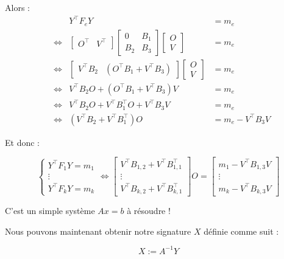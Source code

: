 \documentclass[12pt, a4paper]{article}
\begin{document}
	Alors :
	\begin{align*}
		&&Y^\top F_e Y &= m_e \\
		&\Leftrightarrow &\begin{bmatrix} O^\top & V^\top \end{bmatrix} \begin{bmatrix}
			0 & B_1 \\
			B_2 & B_3
		\end{bmatrix} \begin{bmatrix} O \\ V \end{bmatrix} &= m_e \\
		&\Leftrightarrow &\begin{bmatrix} V^\top B_2 & (O^\top B_1 + V^\top B_3) \end{bmatrix} \begin{bmatrix} O \\ V \end{bmatrix} &= m_e \\
		&\Leftrightarrow &V^\top B_2 O + (O^\top B_1 + V^\top B_3) V &= m_e \\
		&\Leftrightarrow &V^\top B_2 O + V^\top B_1^\top O + V^\top B_3V &= m_e \\
		&\Leftrightarrow &(V^\top B_2 + V^\top B_1^\top) O &= m_e - V^\top B_3 V
	\end{align*}
	
	Et donc :
	
	$$
	\begin{cases}
		Y^\top F_1 Y = m_1 \\
		\vdots \\
		Y^\top F_k Y = m_k
	\end{cases}
	\Leftrightarrow\begin{bmatrix}
		V^\top B_{1, 2} + V^\top B_{1, 1}^\top \\
		\vdots \\
		V^\top B_{k, 2} + V^\top B_{k, 1}^\top
	\end{bmatrix}
	O = \begin{bmatrix}
		m_1 - V^\top B_{1, 3}V\\
		\vdots \\
		m_k - V^\top B_{k, 3}V
	\end{bmatrix}
	$$
	
	C'est un simple système $Ax = b$ à résoudre !
	
	Nous pouvons maintenant obtenir notre signature $X$ définie comme suit :
	
	$$X := A^{-1}Y$$
	
\end{document}
